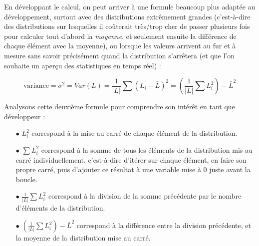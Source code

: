 \documentclass[11pt,a4paper]{article}
\begin{document}

\bigskip

En développant le calcul, on peut arriver à une formule beaucoup plus adaptée au développement, surtout avec des distributions extrêmement grandes (c'est-à-dire des distributions sur lesquelles il coûterait très/trop cher de passer plusieurs fois pour calculer tout d'abord la \textit{moyenne}, et seulement ensuite la différence de chaque élément avec la moyenne), ou lorsque les valeurs arrivent au fur et à mesure sans savoir précisément quand la distribution s'arrêtera (et que l'on souhaite un aperçu des statistiques en temps réel) :

\begin{center}
\begin{equation*}
\text{variance} = \sigma^{2} = Var(L) = \frac{1}{|L|} \sum (L_{i} - \bar{L})^{2} = \left( \frac{1}{|L|} \sum L_{i}^{2} \right) - \bar{L}^{2}
\end{equation*}
\end{center}

\bigskip

Analysons cette deuxième formule pour comprendre son intérêt en tant que développeur :

\medskip

\begin{itemize}
\item[$\bullet$] $ L_{i}^{2} $ correspond à la mise au carré de chaque élément de la distribution.

\item[$\bullet$] $ \sum L_{i}^{2} $ correspond à la somme de tous les éléments de la distribution mis au carré individuellement, c'est-à-dire d'itérer sur chaque élément, en faire son propre carré, puis d'ajouter ce résultat à une variable mise à $ 0 $ juste avant la boucle.

\item[$\bullet$] $ \frac{1}{|L|} \sum L_{i}^{2} $ correspond à la division de la somme précédente par le nombre d'éléments de la distribution.

\item[$\bullet$] $ ( \frac{1}{|L|} \sum L_{i}^{2} ) - \bar{L}^{2} $ correspond à la différence entre la division précédente, et la moyenne de la distribution mise au carré.
\end{itemize}
\end{document}
